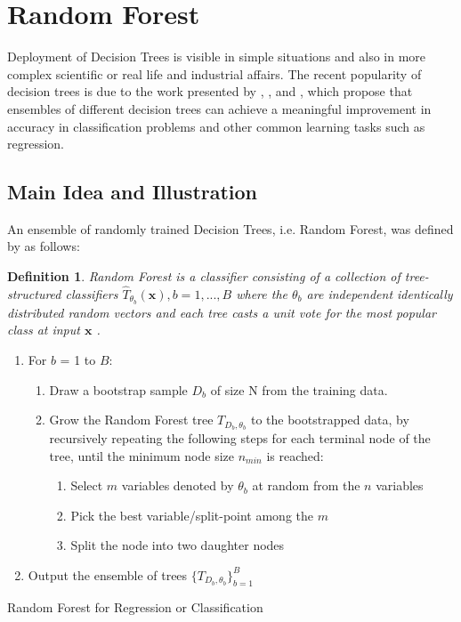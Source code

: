 \pagebreak
\section{Random Forest}
Deployment of Decision Trees is visible in simple situations and also in more complex scientific or 
real life and industrial affairs.
The recent popularity of decision trees is due to the work presented by 
\cite{Breiman1996OUT-OF-BAG-E}, \cite{breiman2001random}, and \cite{breiman2004consistency}, which propose that
ensembles of different decision trees can achieve a meaningful improvement in accuracy in classification problems and other 
common learning tasks such as regression.

\subsection{Main Idea and Illustration}
An ensemble of randomly trained Decision Trees, i.e. Random Forest, was defined by \cite{breiman2001random} as follows:

\newtheorem{definition}{Definition}
\begin{definition}
	Random Forest is a classifier consisting of a collection of tree-structured 
	classifiers ${\hat{T}_{\theta_{b}}(\textbf{x})}, b = 1,...,B$ where the $\theta_{b}$ are independent identically
	distributed random vectors and each tree casts a unit vote for the most popular class at input $\textbf{x}$ .
\end{definition}

\begin{algorithm}[H]
\SetAlgoLined
\begin{enumerate}
	\item For $b$ = 1 to $B$:
	\begin{enumerate}
	    \item Draw a bootstrap sample $D_{b}$ of size N from the training data.
	    \item Grow the Random Forest tree ${{T}_{D_{b},\theta_{b}}}$ to the bootstrapped data, by recursively repeating the following steps for each terminal node of the tree, until the minimum node size $n_{min}$ is reached:
	    \begin{enumerate}
	       \item Select $m$ variables denoted by $\theta_{b}$ at random from the $n$ variables
	       \item Pick the best variable/split-point among the $m$
	       \item  Split the node into two daughter nodes
	    \end{enumerate}
	\end{enumerate}
	\item  Output the ensemble of trees $\{{T}_{D_{b},\theta_{b}}\}_{b=1}^{B}$
\end{enumerate}
 \caption{Random Forest for Regression or Classification \cite{friedman2001elements}}
\end{algorithm}

